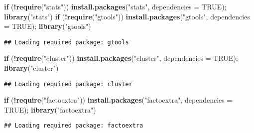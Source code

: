 \documentclass[
]{article}
\newenvironment{Shaded}{\begin{snugshade}}{\end{snugshade}}
\newcommand{\AttributeTok}[1]{\textcolor[rgb]{0.13,0.29,0.53}{#1}}
\newcommand{\ConstantTok}[1]{\textcolor[rgb]{0.56,0.35,0.01}{#1}}
\newcommand{\ControlFlowTok}[1]{\textcolor[rgb]{0.13,0.29,0.53}{\textbf{#1}}}
\newcommand{\FunctionTok}[1]{\textcolor[rgb]{0.13,0.29,0.53}{\textbf{#1}}}
\newcommand{\NormalTok}[1]{#1}
\newcommand{\SpecialCharTok}[1]{\textcolor[rgb]{0.81,0.36,0.00}{\textbf{#1}}}
\newcommand{\StringTok}[1]{\textcolor[rgb]{0.31,0.60,0.02}{#1}}
\begin{document}
\begin{Shaded}
\begin{Highlighting}[]
\ControlFlowTok{if}\NormalTok{ (}\SpecialCharTok{!}\FunctionTok{require}\NormalTok{(}\StringTok{"stats"}\NormalTok{)) }\FunctionTok{install.packages}\NormalTok{(}\StringTok{"stats"}\NormalTok{, }\AttributeTok{dependencies =} \ConstantTok{TRUE}\NormalTok{); }\FunctionTok{library}\NormalTok{(}\StringTok{"stats"}\NormalTok{)}
\ControlFlowTok{if}\NormalTok{ (}\SpecialCharTok{!}\FunctionTok{require}\NormalTok{(}\StringTok{"gtools"}\NormalTok{)) }\FunctionTok{install.packages}\NormalTok{(}\StringTok{"gtools"}\NormalTok{, }\AttributeTok{dependencies =} \ConstantTok{TRUE}\NormalTok{); }\FunctionTok{library}\NormalTok{(}\StringTok{"gtools"}\NormalTok{)}
\end{Highlighting}
\end{Shaded}

\begin{verbatim}
## Loading required package: gtools
\end{verbatim}

\begin{Shaded}
\begin{Highlighting}[]
\ControlFlowTok{if}\NormalTok{ (}\SpecialCharTok{!}\FunctionTok{require}\NormalTok{(}\StringTok{"cluster"}\NormalTok{)) }\FunctionTok{install.packages}\NormalTok{(}\StringTok{"cluster"}\NormalTok{, }\AttributeTok{dependencies =} \ConstantTok{TRUE}\NormalTok{); }\FunctionTok{library}\NormalTok{(}\StringTok{"cluster"}\NormalTok{)}
\end{Highlighting}
\end{Shaded}

\begin{verbatim}
## Loading required package: cluster
\end{verbatim}

\begin{Shaded}
\begin{Highlighting}[]
\ControlFlowTok{if}\NormalTok{ (}\SpecialCharTok{!}\FunctionTok{require}\NormalTok{(}\StringTok{"factoextra"}\NormalTok{)) }\FunctionTok{install.packages}\NormalTok{(}\StringTok{"factoextra"}\NormalTok{, }\AttributeTok{dependencies =} \ConstantTok{TRUE}\NormalTok{); }\FunctionTok{library}\NormalTok{(}\StringTok{"factoextra"}\NormalTok{)}
\end{Highlighting}
\end{Shaded}

\begin{verbatim}
## Loading required package: factoextra
\end{verbatim}
\end{document}
